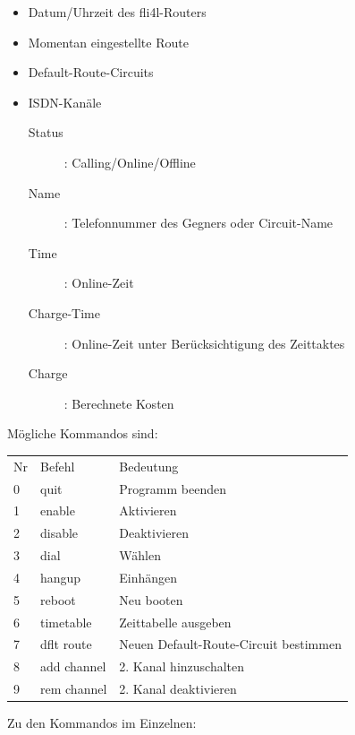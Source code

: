   \begin{itemize}
  \item Datum/Uhrzeit des fli4l-Routers

  \item Momentan eingestellte Route

  \item Default-Route-Circuits

  \item ISDN-Kanäle
    \begin{description}
    \item[Status]:         Calling/Online/Offline
    \item[Name]:           Telefonnummer des Gegners oder Circuit-Name
    \item[Time]:           Online-Zeit
    \item[Charge-Time]:    Online-Zeit unter Berücksichtigung des Zeittaktes
    \item[Charge]:         Berechnete Kosten
    \end{description}
  \end{itemize}

  Mögliche Kommandos sind:

  \begin{tabular}{lll}
    Nr   &Befehl             &Bedeutung\\
    0   &quit                &Programm beenden\\
    1   &enable              &Aktivieren\\
    2   &disable             &Deaktivieren\\
    3   &dial                &Wählen\\
    4   &hangup              &Einhängen\\
    5   &reboot              &Neu booten\\
    6   &timetable           &Zeittabelle ausgeben\\
    7   &dflt route          &Neuen Default-Route-Circuit bestimmen\\
    8   &add channel         &2. Kanal hinzuschalten\\
    9   &rem channel         &2. Kanal deaktivieren\\
  \end{tabular}

  \medskip

  \noindent Zu den Kommandos im Einzelnen:

